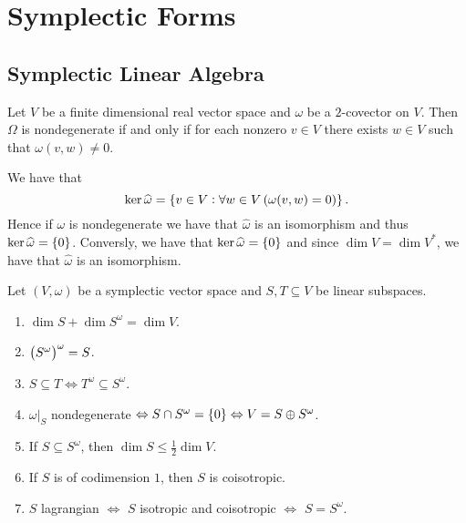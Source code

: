 \chapter{Symplectic Forms}
\section{Symplectic Linear Algebra}
\begin{exercise}
Let $V$ be a finite dimensional real vector space and $\omega$ be a $2$-covector on $V$. Then $\Omega$ is nondegenerate if and only if for each nonzero $v \in V$ there exists $w \in V$ such that $\omega(v,w) \neq 0$.
\end{exercise}

\begin{solution}
We have that 
\begin{equation*}
\ker \widehat{\omega} = \cbr[0]{v \in V : \forall w \in V\del[0]{\omega(v,w) = 0}}.
\end{equation*}
Hence if $\omega$ is nondegenerate we have that $\widehat{\omega}$ is an isomorphism and thus $\ker\widehat{\omega} = \cbr[0]{0}$. Conversly, we have that $\ker\widehat{\omega} = \cbr[0]{0}$ and since $\dim V = \dim V^*$, we have that $\widehat{\omega}$ is an isomorphism.
\end{solution}

\begin{exercise}
Let $(V,\omega)$ be a symplectic vector space and $S,T \subseteq V$ be linear subspaces.
\begin{enumerate}[label = \textup{(}\alph*\textup{)}]
\item $\dim S + \dim S^\omega = \dim V$.
\item $\del[1]{S^\omega}^\omega = S$.
\item $S \subseteq T \Leftrightarrow T^\omega \subseteq S^\omega$.
\item $\omega\vert_{S}$ nondegenerate $\Leftrightarrow S \cap S^\omega = \cbr[0]{0} \Leftrightarrow V = S \oplus S^\omega$.
\item If $S \subseteq S^\omega$, then $\dim S \leq \frac{1}{2}\dim V$.
\item If $S$ is of codimension $1$, then $S$ is coisotropic. 
\item $S$ lagrangian $\Leftrightarrow$ $S$ isotropic and coisotropic $\Leftrightarrow$ $S = S^\omega$.
\end{enumerate}
\end{exercise}

